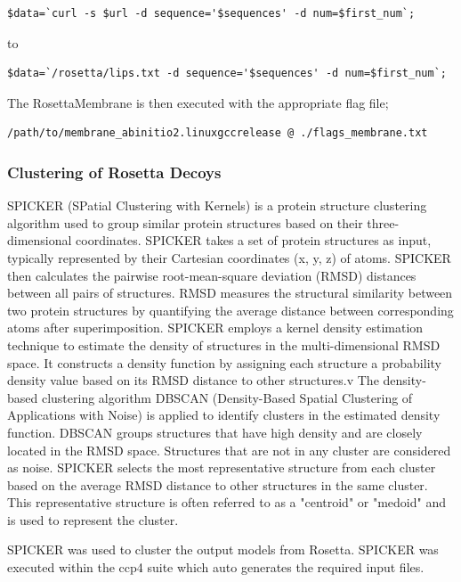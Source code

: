 \begin{lstlisting}[style=linux-terminal]
$data=`curl -s $url -d sequence='$sequences' -d num=$first_num`;
\end{lstlisting}
to \\

\begin{lstlisting}[style=linux-terminal]
$data=`/rosetta/lips.txt -d sequence='$sequences' -d num=$first_num`;
\end{lstlisting}

The RosettaMembrane is then executed with the appropriate flag file;

\begin{lstlisting}[style=linux-terminal]
/path/to/membrane_abinitio2.linuxgccrelease @ ./flags_membrane.txt
\end{lstlisting}

\subsubsection{Clustering of Rosetta Decoys}
SPICKER \cite{Zhang2004} (SPatial Clustering with Kernels) is a protein structure clustering algorithm used to group similar protein structures based on their three-dimensional coordinates. SPICKER takes a set of protein structures as input, typically represented by their Cartesian coordinates (x, y, z) of atoms. SPICKER then calculates the pairwise root-mean-square deviation (RMSD) distances between all pairs of structures. RMSD measures the structural similarity between two protein structures by quantifying the average distance between corresponding atoms after superimposition. SPICKER employs a kernel density estimation technique to estimate the density of structures in the multi-dimensional RMSD space. It constructs a density function by assigning each structure a probability density value based on its RMSD distance to other structures.v The density-based clustering algorithm DBSCAN (Density-Based Spatial Clustering of Applications with Noise) is applied to identify clusters in the estimated density function. DBSCAN groups structures that have high density and are closely located in the RMSD space. Structures that are not in any cluster are considered as noise.  SPICKER selects the most representative structure from each cluster based on the average RMSD distance to other structures in the same cluster. This representative structure is often referred to as a "centroid" or "medoid" and is used to represent the cluster.

SPICKER \cite{Zhang2004} was used to cluster the output models from Rosetta.  SPICKER was executed within the ccp4 suite which auto generates the required input files.


